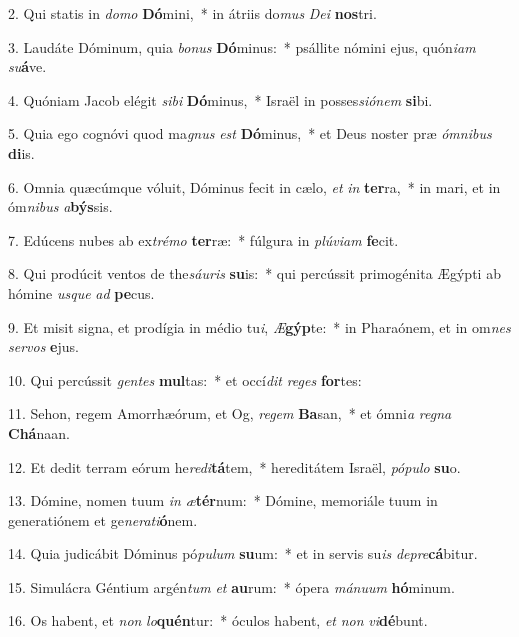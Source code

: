2. Qui statis in \textit{do}\textit{mo} \textbf{Dó}mini,~*  in átriis do\textit{mus} \textit{De}\textit{i} \textbf{nos}tri.\

3. Laudáte Dóminum, quia \textit{bo}\textit{nus} \textbf{Dó}minus:~*  psállite nómini ejus, quón\textit{i}\textit{am} \textit{su}\textbf{á}ve.\

4. Quóniam Jacob elégit \textit{si}\textit{bi} \textbf{Dó}minus,~*  Israël in posses\textit{si}\textit{ó}\textit{nem} \textbf{si}bi.\

5. Quia ego cognóvi quod ma\textit{gnus} \textit{est} \textbf{Dó}minus,~*  et Deus noster præ \textit{óm}\textit{ni}\textit{bus} \textbf{di}is.\

6. Omnia quæcúmque vóluit, Dóminus fecit in cælo, \textit{et} \textit{in} \textbf{ter}ra,~*  in mari, et in óm\textit{ni}\textit{bus} \textit{a}\textbf{býs}sis.\

7. Edúcens nubes ab ex\textit{tré}\textit{mo} \textbf{ter}ræ:~*  fúlgura in \textit{plú}\textit{vi}\textit{am} \textbf{fe}cit.\

8. Qui prodúcit ventos de the\textit{sáu}\textit{ris} \textbf{su}is:~*  qui percússit primogénita Ægýpti ab hómine \textit{us}\textit{que} \textit{ad} \textbf{pe}cus.\

9. Et misit signa, et prodígia in médio tu\textit{i}, \textit{Æ}\textbf{gýp}te:~*  in Pharaónem, et in om\textit{nes} \textit{ser}\textit{vos} \textbf{e}jus.\

10. Qui percússit \textit{gen}\textit{tes} \textbf{mul}tas:~*  et occí\textit{dit} \textit{re}\textit{ges} \textbf{for}tes:\

11. Sehon, regem Amorrhæórum, et Og, \textit{re}\textit{gem} \textbf{Ba}san,~*  et ómni\textit{a} \textit{re}\textit{gna} \textbf{Chá}naan.\

12. Et dedit terram eórum he\textit{re}\textit{di}\textbf{tá}tem,~*  hereditátem Israël, \textit{pó}\textit{pu}\textit{lo} \textbf{su}o.\

13. Dómine, nomen tuum \textit{in} \textit{æ}\textbf{tér}num:~*  Dómine, memoriále tuum in generatiónem et ge\textit{ne}\textit{ra}\textit{ti}\textbf{ó}nem.\

14. Quia judicábit Dóminus pó\textit{pu}\textit{lum} \textbf{su}um:~*  et in servis su\textit{is} \textit{de}\textit{pre}\textbf{cá}bitur.\

15. Simulácra Géntium argén\textit{tum} \textit{et} \textbf{au}rum:~*  ópera \textit{má}\textit{nu}\textit{um} \textbf{hó}minum.\

16. Os habent, et \textit{non} \textit{lo}\textbf{quén}tur:~*  óculos habent, \textit{et} \textit{non} \textit{vi}\textbf{dé}bunt.\

